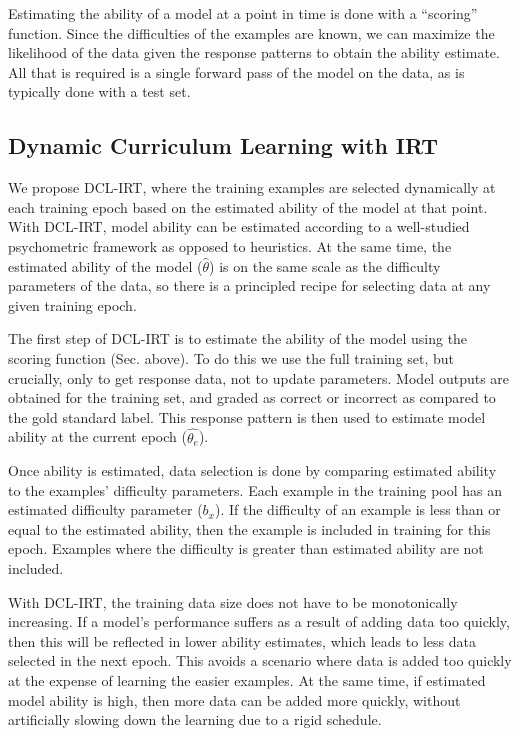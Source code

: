 \documentclass[letterpaper]{article} %
\begin{document}
Estimating the ability of a model at a point in time is done with a ``scoring'' function. 
Since the difficulties of the examples are known, we can maximize the likelihood of the data given the response patterns to obtain the ability estimate.
All that is required is a single forward pass of the model on the data, as is typically done with a test set. 

\subsection{Dynamic Curriculum Learning with IRT}

We propose DCL-IRT, where the training examples are selected dynamically at each training epoch based on the estimated ability of the model at that point.
With DCL-IRT, model ability can be estimated according to a well-studied psychometric framework as opposed to heuristics.
At the same time, the estimated ability of the model ($\hat{\theta}$) is on the same scale as the difficulty parameters of the data, so there is a principled recipe for selecting data at any given training epoch.


The first step of DCL-IRT is to estimate the ability of the model using the scoring function (Sec. above). 
To do this we use the full training set, but crucially, only to get response data, not to update parameters. 
Model outputs are obtained for the training set, and graded as correct or incorrect as compared to the gold standard label. 
This response pattern is then used to estimate model ability at the current epoch ($\hat{\theta_e}$).

Once ability is estimated, data selection is done by comparing estimated ability to the examples' difficulty parameters.
Each example in the training pool has an estimated difficulty parameter ($b_x$).
If the difficulty of an example is less than or equal to the estimated ability, then the example is included in training for this epoch.
Examples where the difficulty is greater than estimated ability are not included.

With DCL-IRT, the training data size does not have to be monotonically increasing. If a model's performance suffers as a result of adding data too quickly, then this will be reflected in lower ability estimates, which leads to less data selected in the next epoch. 
This avoids a scenario where data is added too quickly at the expense of learning the easier examples.
At the same time, if estimated model ability is high, then more data can be added more quickly, without artificially slowing down the learning due to a rigid schedule.
\end{document}
